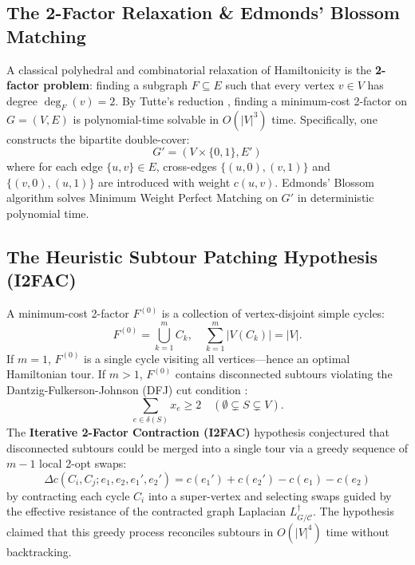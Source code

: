 \documentclass[11pt,a4paper]{article}
\renewcommand{\_}{\origunderscore\allowbreak}
\theoremstyle{plain}
\theoremstyle{definition}
\theoremstyle{remark}
\begin{document}
\subsection{The 2-Factor Relaxation \& Edmonds' Blossom Matching}
A classical polyhedral and combinatorial relaxation of Hamiltonicity is the \textbf{2-factor problem}: finding a subgraph $F \subseteq E$ such that every vertex $v \in V$ has degree $\deg_F(v) = 2$.
By Tutte's reduction \cite{tutte1952}, finding a minimum-cost 2-factor on $G = (V, E)$ is polynomial-time solvable in $O(|V|^3)$ time. Specifically, one constructs the bipartite double-cover:
\begin{equation}
  G' = (V \times \{0, 1\}, E')
\end{equation}
where for each edge $\{u, v\} \in E$, cross-edges $\{(u, 0), (v, 1)\}$ and $\{(v, 0), (u, 1)\}$ are introduced with weight $c(u, v)$. Edmonds' Blossom algorithm \cite{edmonds1965} solves Minimum Weight Perfect Matching on $G'$ in deterministic polynomial time.

\subsection{The Heuristic Subtour Patching Hypothesis (I2FAC)}
A minimum-cost 2-factor $F^{(0)}$ is a collection of vertex-disjoint simple cycles:
\begin{equation}
  F^{(0)} = \bigcup_{k=1}^m C_k, \quad \sum_{k=1}^m |V(C_k)| = |V|.
\end{equation}
If $m = 1$, $F^{(0)}$ is a single cycle visiting all vertices---hence an optimal Hamiltonian tour. If $m > 1$, $F^{(0)}$ contains disconnected subtours violating the Dantzig-Fulkerson-Johnson (DFJ) cut condition \cite{dfj1954}:
\begin{equation}
  \sum_{e \in \delta(S)} x_e \ge 2 \quad (\emptyset \subsetneq S \subsetneq V).
\end{equation}
The \textbf{Iterative 2-Factor Contraction (I2FAC)} hypothesis conjectured that disconnected subtours could be merged into a single tour via a greedy sequence of $m - 1$ local 2-opt swaps:
\begin{equation}
  \Delta c(C_i, C_j; e_1, e_2, e_1', e_2') = c(e_1') + c(e_2') - c(e_1) - c(e_2)
\end{equation}
by contracting each cycle $C_i$ into a super-vertex and selecting swaps guided by the effective resistance of the contracted graph Laplacian $L_{G/\mathcal{C}}^\dagger$. The hypothesis claimed that this greedy process reconciles subtours in $O(|V|^4)$ time without backtracking.
\end{document}
